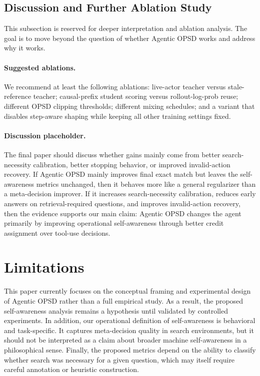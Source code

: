 \documentclass[11pt]{article}
\newcommand{\method}{Agentic OPSD}
\begin{document}
\subsection{Discussion and Further Ablation Study}
This subsection is reserved for deeper interpretation and ablation analysis. The goal is to move beyond the question of whether \method{} works and address why it works.

\paragraph{Suggested ablations.}
We recommend at least the following ablations: live-actor teacher versus stale-reference teacher; causal-prefix student scoring versus rollout-log-prob reuse; different OPSD clipping thresholds; different mixing schedules; and a variant that disables step-aware shaping while keeping all other training settings fixed.

\paragraph{Discussion placeholder.}
The final paper should discuss whether gains mainly come from better search-necessity calibration, better stopping behavior, or improved invalid-action recovery. If \method{} mainly improves final exact match but leaves the self-awareness metrics unchanged, then it behaves more like a general regularizer than a meta-decision improver. If it increases search-necessity calibration, reduces early answers on retrieval-required questions, and improves invalid-action recovery, then the evidence supports our main claim: \method{} changes the agent primarily by improving operational self-awareness through better credit assignment over tool-use decisions.

\section*{Limitations}
This paper currently focuses on the conceptual framing and experimental design of Agentic OPSD rather than a full empirical study. As a result, the proposed self-awareness analysis remains a hypothesis until validated by controlled experiments. In addition, our operational definition of self-awareness is behavioral and task-specific. It captures meta-decision quality in search environments, but it should not be interpreted as a claim about broader machine self-awareness in a philosophical sense. Finally, the proposed metrics depend on the ability to classify whether search was necessary for a given question, which may itself require careful annotation or heuristic construction.


\end{document}
